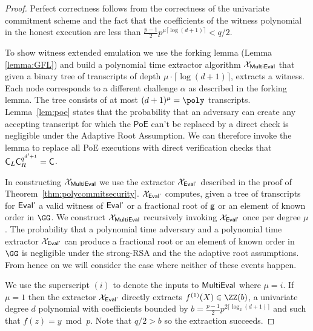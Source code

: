 \begin{proof}
	Perfect correctness follows from the correctness of the univariate commitment scheme and the fact that the coefficients of the witness polynomial in the honest execution are less than $\frac{p-1}{2}p^{\mu \lceil\log(d+1)\rceil}<q/2$.
	
	To show witness extended emulation we use the forking lemma (Lemma \ref{lemma:GFL}) and build a polynomial time extractor algorithm $\mathcal{X}_{\textsf{{MultiEval}}}$ that given a binary tree of transcripts of depth $\mu \cdot\lceil\log(d+1)\rceil$, extracts a witness. Each node corresponds to a different challenge $\alpha$ as described in the forking lemma. The tree consists of at most $(d+1)^{\mu}=\poly$ transcripts. 
	Lemma~\ref{lem:poe} states that the probability that an adversary can create any accepting transcript for which the $\textsf{PoE}$ can't be replaced by a direct check is negligible under the Adaptive Root Assumption.
We can therefore invoke the lemma to replace all \textsf{PoE} executions with direct verification checks that $\mathsf{C}_L\mathsf{C}_R^{q^{d'+1}}=\mathsf{C}$. 

In constructing $\mathcal{X}_{\textsf{{MultiEval}}}$ we use the extractor $\mathcal{X}_{\textsf{{Eval'}}}$ described in the proof of Theorem~\ref{thm:polycommitsecurity}. $\mathcal{X}_{\textsf{{Eval'}}}$ computes, given a tree of transcripts for $\textsf{{Eval'}}$ a valid witness of $\textsf{{Eval'}}$ or a fractional root of $\mathsf{g}$ or an element of known order in $\GG$. We construct $\mathcal{X}_{\textsf{{MultiEval}}}$ recursively invoking $\mathcal{X}_{\textsf{{Eval'}}}$ once per degree $\mu$. The probability that a polynomial time adversary and a polynomial time extractor $\mathcal{X}_{\textsf{{Eval'}}}$ can produce a fractional root or an element of known order in $\GG$ is negligible under the strong-RSA and the the adaptive root assumptions. From hence on we will consider the case where neither of these events happen.

We use the superscript $(i)$ to denote the inputs to $\textsf{{MultiEval}}$ where $\mu=i$. 
If $\mu=1$ then the extractor $\mathcal{X}_{\textsf{{Eval'}}}$ directly extracts $f^{(1)}(X)\in \ZZ(b)$, a univariate degree $d$ polynomial with coefficients bounded by $b=\frac{p-1}{2}p^{2 \lceil\log_2(d+1)\rceil}$ and such that $f(z)=y \bmod p$. Note that $q/2>b$ so the extraction succeeds.


\end{proof}
